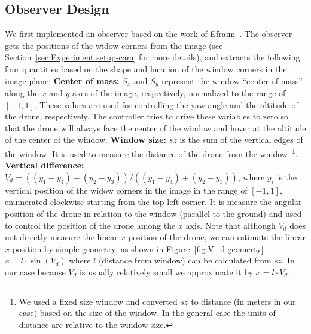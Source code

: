 \documentclass[ twoside, 12pt ]{article}
\begin{document}
\subsection{Observer Design}
\label{sec:Observer Design}
We first implemented an observer based on the work of Efraim~\cite{Efraim17}. The observer gets the positions of the widow corners from the image (see Section~\ref{sec:Experiment setup-cam} for more details), %
and extracts the following four quantities based on the shape and location of the window corners in the image plane: %
\textbf{Center of mass:} $S_x$ and $S_y$ represent the window ``center of mass'' along the $x$ and $y$ axes of the image, respectively, normalized to the range of $[-1,1]$.
These values are used for controlling the yaw angle and the altitude of the drone, respectively. The controller tries to drive these variables to zero so that the drone will  always face the center of the window and hover at the altitude of the center of the window. 
\textbf{Window size:} $sz$ is the sum of the vertical edges of the window. It is used to measure the distance of the drone from the window~\footnote{We used a fixed size window and converted $sz$ to distance (in meters in our case) based on the size of the window. In the general case the units of distance are relative to the window size.}.
\textbf{Vertical difference:} $V_d = {((y_1-y_4)-(y_2-y_3))}/{((y_1-y_4)+(y_2-y_3))}$, where $y_i$ is the vertical position of the widow corners in the image in the range of $[-1,1]$, enumerated clockwise starting from the top left corner. It is measure the angular position of the drone in relation to the window (parallel to the ground) and used to control the position of the drone among the $x$ axis.
Note that although $V_d$ does not directly measure the linear $x$ position of the drone, we can estimate the linear $x$ position by simple geometry:
as shown in Figure~\ref{fig:V_d-geomerty} $x = l \cdot \sin (V_d)$ where $l$ (distance from window) can be calculated from $sz$. In our case because $V_d$ is usually relatively small we approximate it by $x = l \cdot V_d$.
\end{document}
